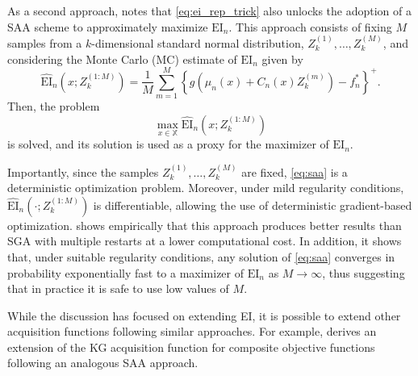 \documentclass{wscpaperproc}
\newcommand{\X}{\mathbb{X}}
\newcommand{\EI}{\mathrm{EI}}
\theoremstyle{wsc}
\begin{document}
As a second approach,  notes that  \eqref{eq:ei_rep_trick} also unlocks the adoption of a SAA scheme to approximately maximize $\EI_n$. This approach consists of fixing $M$ samples from a $k$-dimensional standard normal distribution, $Z_k^{(1)}, \ldots, Z_k^{(M)}$, and considering the Monte Carlo (MC) estimate of $\EI_n$ given by
\begin{equation*}
    \widehat{\EI}_n\left(x;Z_k^{(1:M)}\right) = \frac{1}{M} \sum_{m=1}^M \left\{g\left(\mu_n(x) + C_n(x)Z_k^{(m)}\right) - f_n^*\right\}^+.
\end{equation*}
Then, the problem
\begin{equation}
\label{eq:saa}
   \max_{x\in\X}\widehat{\EI}_n\left(x;Z_k^{(1:M)}\right) 
\end{equation}
is solved, and its solution is used as a proxy for the maximizer of $\EI_n$.

Importantly, since the samples $Z_k^{(1)}, \ldots, Z_k^{(M)}$ are fixed, \eqref{eq:saa} is a deterministic optimization problem. Moreover, under mild regularity conditions, $\widehat{\EI}_n\left(\cdot;Z_k^{(1:M)}\right)$ is differentiable, allowing the use of deterministic gradient-based optimization.  shows empirically that this approach produces better results than SGA with multiple restarts at a lower computational cost. In addition, it shows that, under suitable regularity conditions, any solution of \eqref{eq:saa} converges in probability exponentially fast to a maximizer of $\EI_n$ as $M\rightarrow\infty$, thus suggesting that in practice it is safe to use low values of $M$.

While the discussion has focused on extending EI, it is possible to extend other acquisition functions following similar approaches. For example,  derives an extension of the KG acquisition function for composite objective functions following an analogous SAA approach.
\end{document}
